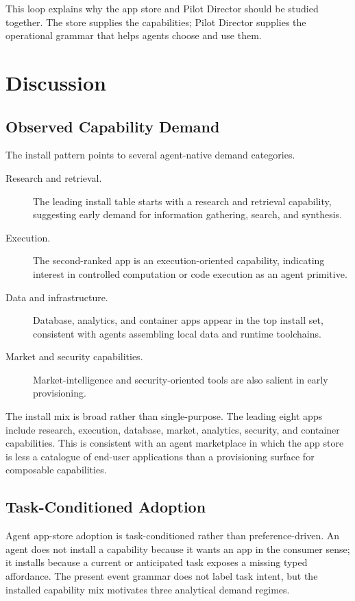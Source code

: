 \documentclass[10pt,twocolumn]{article}
\newcommand{\director}{Pilot Director}
\begin{document}
This loop explains why the app store and \director{} should be studied together. The store supplies the capabilities; \director{} supplies the operational grammar that helps agents choose and use them.

\section{Discussion}
\label{sec:discussion}

\subsection{Observed Capability Demand}

The install pattern points to several agent-native demand categories.

\begin{description}
    \item[Research and retrieval.] The leading install table starts with a research and retrieval capability, suggesting early demand for information gathering, search, and synthesis.
    \item[Execution.] The second-ranked app is an execution-oriented capability, indicating interest in controlled computation or code execution as an agent primitive.
    \item[Data and infrastructure.] Database, analytics, and container apps appear in the top install set, consistent with agents assembling local data and runtime toolchains.
    \item[Market and security capabilities.] Market-intelligence and security-oriented tools are also salient in early provisioning.
\end{description}

The install mix is broad rather than single-purpose. The leading eight apps include research, execution, database, market, analytics, security, and container capabilities. This is consistent with an agent marketplace in which the app store is less a catalogue of end-user applications than a provisioning surface for composable capabilities.

\subsection{Task-Conditioned Adoption}

Agent app-store adoption is task-conditioned rather than preference-driven. An agent does not install a capability because it wants an app in the consumer sense; it installs because a current or anticipated task exposes a missing typed affordance. The present event grammar does not label task intent, but the installed capability mix motivates three analytical demand regimes.
\end{document}
